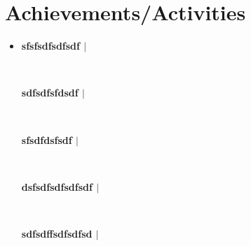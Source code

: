 \documentclass[letterpaper,5pt]{article}
\begin{document}
    
    
          \section{Achievements/Activities}
          \begin{itemize}[leftmargin=0.15in, label={}]
          \item[]
          
            \textbf{sfsfsdfsdfsdf $|$ \emph{} } \hfill{}

                \hspace{0.15in}
                \ 
                \newline

                \vspace{-10pt} 
                
            \textbf{sdfsdfsfdsdf $|$ \emph{} } \hfill{}

                \hspace{0.15in}
                \ 
                \newline

                \vspace{-10pt} 
                
            \textbf{sfsdfdsfsdf $|$ \emph{} } \hfill{}

                \hspace{0.15in}
                \ 
                \newline

                \vspace{-10pt} 
                
            \textbf{dsfsdfsdfsdfsdf $|$ \emph{} } \hfill{}

                \hspace{0.15in}
                \ 
                \newline

                \vspace{-10pt} 
                
            \textbf{sdfsdffsdfsdfsd $|$ \emph{} } \hfill{}

                \hspace{0.15in}
                \ 
                \newline

                \vspace{-10pt} 
                
                
            \end{itemize}
          
      
\end{document}
